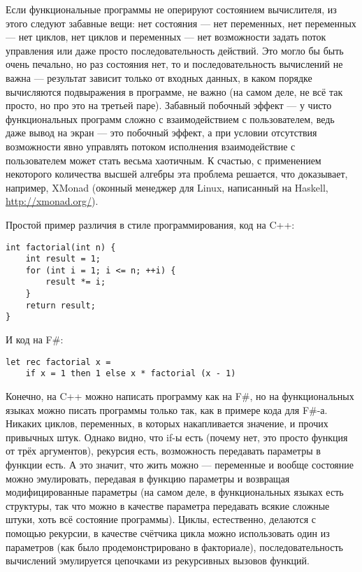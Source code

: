 \documentclass[a5paper]{article}
\begin{document}
Если функциональные программы не оперируют состоянием вычислителя, из этого следуют забавные вещи: нет состояния --- нет переменных, нет переменных --- нет циклов, нет циклов и переменных --- нет возможности задать поток управления или даже просто последовательность действий. Это могло бы быть очень печально, но раз состояния нет, то и последовательность вычислений не важна --- результат зависит только от входных данных, в каком порядке вычисляются подвыражения в программе, не важно (на самом деле, не всё так просто, но про это на третьей паре). Забавный побочный эффект --- у чисто функциональных программ сложно с взаимодействием с пользователем, ведь даже вывод на экран --- это побочный эффект, а при условии отсутствия возможности явно управлять потоком исполнения взаимодействие с пользователем может стать весьма хаотичным. К счастью, с применением некоторого количества высшей алгебры эта проблема решается, что доказывает, например, XMonad (оконный менеджер для Linux, написанный на Haskell, \url{http://xmonad.org/}). 

Простой пример различия в стиле программирования, код на C++:
\begin{verbatim}
int factorial(int n) {
    int result = 1;
    for (int i = 1; i <= n; ++i) {
        result *= i;
    }
    return result;
}
\end{verbatim}

И код на F\#:
\begin{verbatim}
let rec factorial x =
    if x = 1 then 1 else x * factorial (x - 1)
\end{verbatim}

Конечно, на C++ можно написать программу как на F\#, но на функциональных языках можно писать программы только так, как в примере кода для F\#-а. Никаких циклов, переменных, в которых накапливается значение, и прочих привычных штук. Однако видно, что if-ы есть (почему нет, это просто функция от трёх аргументов), рекурсия есть, возможность передавать параметры в функции есть. А это значит, что жить можно --- переменные и вообще состояние можно эмулировать, передавая в функцию параметры и возвращая модифицированные параметры (на самом деле, в функциональных языках есть структуры, так что можно в качестве параметра передавать всякие сложные штуки, хоть всё состояние программы). Циклы, естественно, делаются с помощью рекурсии, в качестве счётчика цикла можно использовать один из параметров (как было продемонстрировано в факториале), последовательность вычислений эмулируется цепочками из рекурсивных вызовов функций.
\end{document}
